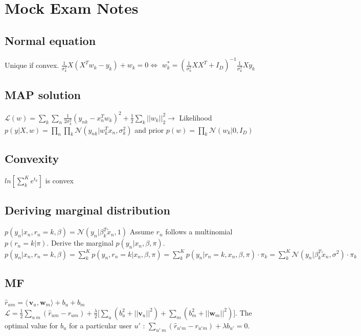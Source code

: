 \newline
\newline
\section{Mock Exam Notes}
\subsection{Normal equation}
Unique if convex.\newline
$\frac{1}{\sigma_k^2} X(X^Tw_k-y_k)+w_k = 0 \Leftrightarrow$ \newline
$ w_k^* = (\frac{1}{\sigma_k^2} XX^T+I_D)^{-1} \frac{1}{\sigma_k^2}Xy_k$

\subsection{MAP solution}
$\mathcal{L}(w) = \sum_k \sum_n \frac{1}{2\sigma_k^2} (y_{nk} - x_n^T w_k)^2 + \frac{1}{2} \sum_k ||w_k||^2_2 \rightarrow$
Likelihood $p(y|X,w) = \prod_n \prod_k \mathcal{N}(y_{nk}|w_k^Tx_n, \sigma_k^2)$ and prior $p(w) = \prod_k \mathcal{N}(w_k|0,I_D)$

\subsection{Convexity}
$ln[\sum_k^Ke^{t_k}]$ is convex

\subsection{Deriving marginal distribution}
$p(y_n|x_n,r_n=k,\beta) = \mathcal{N} (y_n|\beta_k^T\tilde{x}_n,1)$
Assume $r_n$ follows a multinomial $p(r_n=k|\pi)$. Derive the marginal $p(y_n|x_n,\beta,\pi)$.
$p(y_n|x_n,r_n=k,\beta) = \sum_k^K p(y_n,r_n=k|x_n,\beta,\pi) = \sum_k^K p(y_n|r_n=k,x_n,\beta,\pi) \cdot \pi_k = \sum_k^K \mathcal{N}(y_n|\beta_k^T\tilde{x}_n, \sigma^2)\cdot \pi_k$

\subsection{MF}
$\hat{r}_{um} = \langle\,\mathbf{v}_u,\mathbf{w}_m\rangle + b_u + b_m$
$\mathcal{L} = \frac{1}{2} \sum_{u ~ m}(\hat{r}_{um} -r_{um}) + \frac{\lambda}{2} \big[
\sum_u (b_u^2+||\mathbf{v}_u||^2) + \sum_m (b_m^2+||\mathbf{w}_m||^2) \big]$. The optimal value for $b_u$ for a particular user $u'$ : $\sum_{u' ~ m} (\hat{r}_{u'm} - r_{u'm}) + \lambda b_{u'} = 0$.

